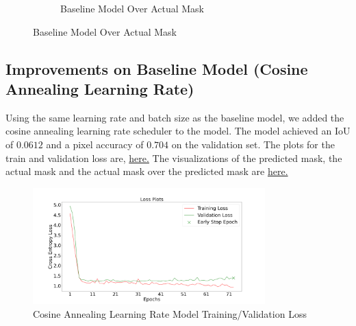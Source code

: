 \documentclass{article}
\begin{document}
\begin{figure}[h!]
\begin{subfigure}[b]{0.45\textwidth}
      \caption{Baseline Model Over Actual Mask}
      \label{fig:baseline_over_actual}
  \end{subfigure}
  \label{fig:baseline_masks_visualization}
\end{figure}

\subsection{Improvements on Baseline Model (Cosine Annealing Learning Rate)}
Using the same learning rate and batch size as the baseline model, we added the cosine annealing learning rate scheduler to the model. The model achieved an IoU of $0.0612$ and a pixel accuracy of $0.704$ on the validation set. The plots for the train and validation loss are, \hyperref[fig:cosine_annealing_train_loss]{here.} The visualizations of the predicted mask, the actual mask and the actual mask over the predicted mask are \hyperref[fig:cosine_annealing_masks_visualization]{here.}

\begin{figure}[h!]
  \centering
  \includegraphics[width=0.8\textwidth]{include/plots/train_4_a_loss.png}
  \caption{Cosine Annealing Learning Rate Model Training/Validation Loss}
  \label{fig:cosine_annealing_train_loss}
\end{figure}
\end{document}
